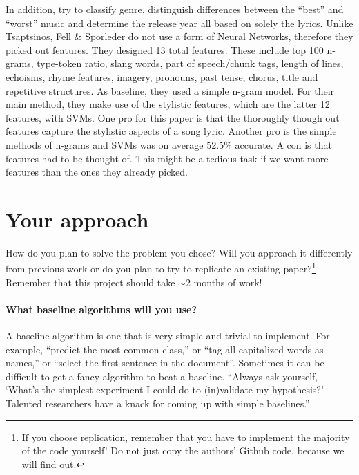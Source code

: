 \documentclass[11pt,a4paper]{article}
\begin{document}
In addition,  try to classify genre, distinguish differences between the “best” and “worst” music and determine the release year all based on solely the lyrics. Unlike Tsaptsinos, Fell & Sporleder do not use a form of Neural Networks, therefore they picked out features. They designed 13 total features. These include top 100 n-grams, type-token ratio, slang words, part of speech/chunk tags, length of lines, echoisms, rhyme features,  imagery, pronouns, past tense, chorus, title and repetitive structures. As baseline, they used a simple n-gram model. For their main method, they make use of the stylistic features, which are the latter 12 features, with SVMs. One pro for this paper is that the thoroughly though out features capture the stylistic aspects of a song lyric. Another pro is the simple methods of n-grams and SVMs was on average 52.5\% accurate. A con is that features had to be thought of. This might be a tedious task if we want more features than the ones they already picked. 

\section{Your approach}
How do you plan to solve the problem you chose? Will you approach it differently from previous work or do you plan to try to replicate an existing paper?\footnote{If you choose replication, remember that you have to implement the majority of the code yourself! Do not just copy the authors' Github code, because we will find out.} Remember that this project should take $\sim 2$ months of work!

\paragraph{What baseline algorithms will you use?}
A baseline algorithm is one that is very simple and trivial to implement. For example, “predict the most common class,” or “tag all capitalized words as names,” or “select the first sentence in the document”. Sometimes it can be difficult to get a fancy algorithm to beat a baseline. “Always ask yourself, ‘What’s the simplest experiment I could do to (in)validate my hypothesis?’ Talented researchers have a knack for coming up with simple baselines.”
\end{document}
